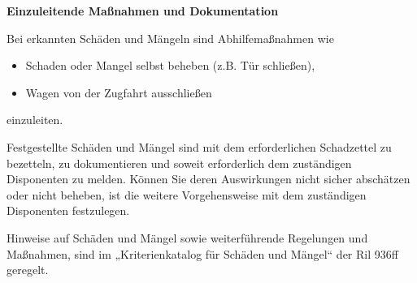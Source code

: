 \textbf{Einzuleitende Maßnahmen und Dokumentation} \par
Bei erkannten Schäden und Mängeln sind Abhilfemaßnahmen wie
\begin{itemize}
    \item Schaden oder Mangel selbst beheben (z.B. Tür schließen),
    \item Wagen von der Zugfahrt ausschließen
\end{itemize}
einzuleiten.\par
Festgestellte Schäden und Mängel sind mit dem erforderlichen Schadzettel zu bezetteln, zu dokumentieren und soweit erforderlich dem zuständigen Disponenten zu melden. Können Sie deren Auswirkungen nicht sicher abschätzen oder nicht beheben, ist die weitere Vorgehensweise mit dem zuständigen Disponenten festzulegen.\par
Hinweise auf Schäden und Mängel sowie weiterführende Regelungen und Maßnahmen, sind im „Kriterienkatalog für Schäden und Mängel“ der Ril 936ff geregelt.
